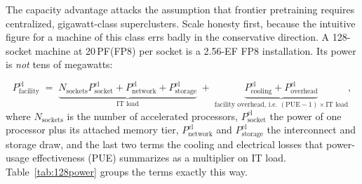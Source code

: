 The capacity advantage attacks the assumption that frontier pretraining requires centralized, gigawatt-class superclusters. Scale honesty first, because the intuitive figure for a machine of this class errs badly in the conservative direction. A 128-socket machine at 20\,PF(FP8) per socket is a 2.56-EF FP8 installation. Its power is \emph{not} tens of megawatts:

\[
P^{\mathrm{el}}_{\text{facility}} \;=\; \underbrace{N_{\text{sockets}}P^{\mathrm{el}}_{\text{socket}} + P^{\mathrm{el}}_{\text{network}} + P^{\mathrm{el}}_{\text{storage}}}_{\text{IT load}} \;+\; \underbrace{P^{\mathrm{el}}_{\text{cooling}} + P^{\mathrm{el}}_{\text{overhead}}}_{\text{facility overhead, i.e.\ }(\mathrm{PUE}-1)\times\text{IT load}} ,
\]
where $N_{\text{sockets}}$ is the number of accelerated processors, $P^{\mathrm{el}}_{\text{socket}}$ the power of one processor plus its attached memory tier, $P^{\mathrm{el}}_{\text{network}}$ and $P^{\mathrm{el}}_{\text{storage}}$ the interconnect and storage draw, and the last two terms the cooling and electrical losses that power-usage effectiveness (PUE) summarizes as a multiplier on IT load. Table~\ref{tab:128power} groups the terms exactly this way.


